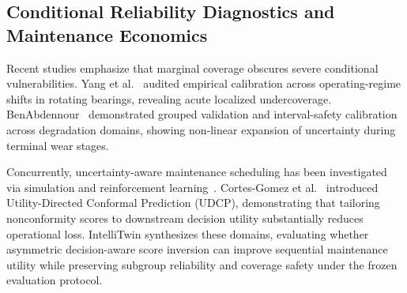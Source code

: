 \subsection{Conditional Reliability Diagnostics and Maintenance Economics}
Recent studies emphasize that marginal coverage obscures severe conditional vulnerabilities. Yang et al.~\cite{yang2026empirical} audited empirical calibration across operating-regime shifts in rotating bearings, revealing acute localized undercoverage. BenAbdennour~\cite{benabdennour2026grouped} demonstrated grouped validation and interval-safety calibration across degradation domains, showing non-linear expansion of uncertainty during terminal wear stages. 

Concurrently, uncertainty-aware maintenance scheduling has been investigated via simulation and reinforcement learning~\cite{chen2022data,zhu2025predictive,walia2026uncertainty}. Cortes-Gomez et al.~\cite{cortesgomez2025utility} introduced Utility-Directed Conformal Prediction (UDCP), demonstrating that tailoring nonconformity scores to downstream decision utility substantially reduces operational loss. IntelliTwin synthesizes these domains, evaluating whether asymmetric decision-aware score inversion can improve sequential maintenance utility while preserving subgroup reliability and coverage safety under the frozen evaluation protocol.
